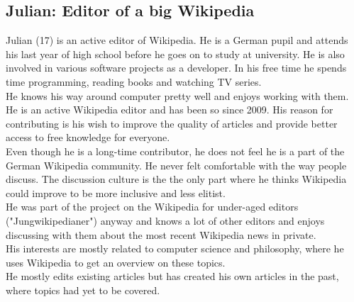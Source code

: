 \subsection{Julian: Editor of a big Wikipedia}
Julian (17) is an active editor of Wikipedia. He is a German pupil and attends his last year of high school before he goes on to study at university. He is also involved in various software projects as a developer. In his free time he spends time programming, reading books and watching TV series. \\
He knows his way around computer pretty well and enjoys working with them. \\
He is an active Wikipedia editor and has been so since 2009. His reason for contributing is his wish to improve the quality of articles and provide better access to free knowledge for everyone. \\
Even though he is a long-time contributor, he does not feel he is a part of the German Wikipedia community. He never felt comfortable with the way people discuss. The discussion culture is the the only part where he thinks Wikipedia could improve to be more inclusive and less elitist. \\
He was part of the project on the Wikipedia for under-aged editors ("Jungwikipedianer") anyway and knows a lot of other editors and enjoys discussing with them about the most recent Wikipedia news in private. \\
His interests are mostly related to computer science and philosophy, where he uses Wikipedia to get an overview on these topics. \\
He mostly edits existing articles but has created his own articles in the past, where topics had yet to be covered.


